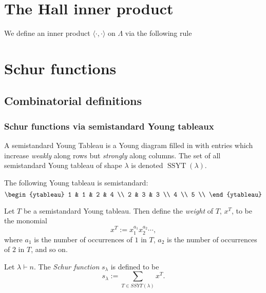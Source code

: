 \documentclass{article}
\DeclareMathOperator{\SSYT}{SSYT}
\begin{document}
\section{The Hall inner product}

We define an inner product $\langle \cdot, \cdot \rangle$ on $\Lambda$ via the following rule

\section{Schur functions}
\subsection{Combinatorial definitions}
\subsubsection{Schur functions via semistandard Young tableaux}

\begin{definition}
    A semistandard Young Tableau is a Young diagram filled in with entries which increase \textit{weakly} along rows but \textit{strongly} along columns. The set of all semistandard Young tableau of shape $\lambda$ is denoted $\SSYT(\lambda)$.
\end{definition}

\begin{example}
    The following Young tableau is semistandard:
    \[
        \begin{ytableau}
            1 & 1 & 2 & 4 \\
            2 & 3 & 3  \\
            4 \\
            5 \\ 
        \end{ytableau}
    \]
\end{example}

\begin{definition}
    Let $T$ be a semistandard Young tableau.  Then define the \textit{weight} of $T$, $x^T$, to be the monomial
    \[
        x^T := x_1^{a_1}x_2^{a_2}\cdots,
    \]
    where $a_1$ is the number of occurrences of $1$ in $T$, $a_2$ is the number of occurrences of $2$ in $T$, and so on.
\end{definition}

\begin{definition}
    Let $\lambda \vdash n$. The \textit{Schur function} $s_\lambda$ is defined to be
    \[
        s_\lambda := \sum_{T \in SSYT(\lambda)} x^T.
    \]
\end{definition}
\end{document}
